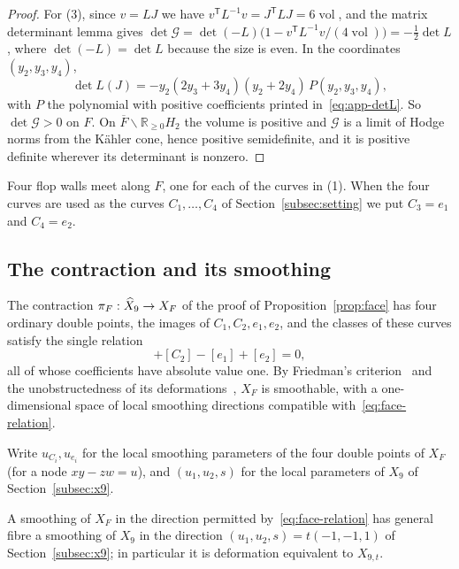 \begin{proof}
For (3), since $v=LJ$ we have $v^{\mathsf T}L^{-1}v=J^{\mathsf T}LJ=6\operatorname{vol}$, and the
matrix determinant lemma gives
$\det\mathcal G=\det(-L)\bigl(1-v^{\mathsf T}L^{-1}v/(4\operatorname{vol})\bigr)=-\tfrac12\det L$, where
$\det(-L)=\det L$ because the size is even. In the coordinates $(y_2,y_3,y_4)$,
\begin{equation}
 \det L(J)=-y_2(2y_3+3y_4)(y_2+2y_4)\,P(y_2,y_3,y_4),
 \label{eq:detL}
\end{equation}
with $P$ the polynomial with positive coefficients printed in~\eqref{eq:app-detL}. So
$\det\mathcal G>0$ on $F$. On $\overline F\smallsetminus\mathbb R_{\ge0}H_2$ the volume is positive
and $\mathcal G$ is a limit of Hodge norms from the K\"ahler cone, hence positive semidefinite, and it
is positive definite wherever its determinant is nonzero.
\end{proof}

Four flop walls meet along $F$, one for each of the curves in (1). When the four curves are
used as the curves $C_1,\dots,C_4$ of Section~\ref{subsec:setting} we put $C_3=e_1$ and
$C_4=e_2$.

\subsection{The contraction and its smoothing}
\label{subsec:face-smoothing}

The contraction $\pi_F:\widehat X_9\to X_F$ of the proof of Proposition~\ref{prop:face} has
four ordinary double points, the images of $C_1,C_2,e_1,e_2$, and the classes of these
curves satisfy the single relation
\begin{equation}
 [C_1]+[C_2]-[e_1]+[e_2]=0 ,
 \label{eq:face-relation}
\end{equation}
all of whose coefficients have absolute value one. By Friedman's
criterion~\cite{Friedman:1986} and the unobstructedness of its deformations~\cite{Gross:1997},
$X_F$ is smoothable, with a one-dimensional space of local
smoothing directions compatible with~\eqref{eq:face-relation}.

Write $u_{C_i},u_{e_i}$ for the local smoothing parameters of the four double points of $X_F$
(for a node $xy-zw=u$), and $(u_1,u_2,s)$ for the local parameters of $X_9$ of
Section~\ref{subsec:x9}.

\begin{proposition}\label{prop:face-smoothing}
A smoothing of $X_F$ in the direction permitted by~\eqref{eq:face-relation} has general fibre a
smoothing of $X_9$ in the direction $(u_1,u_2,s)=t(-1,-1,1)$
of Section~\ref{subsec:x9}; in particular it is deformation equivalent to $X_{9,t}$.
\end{proposition}

